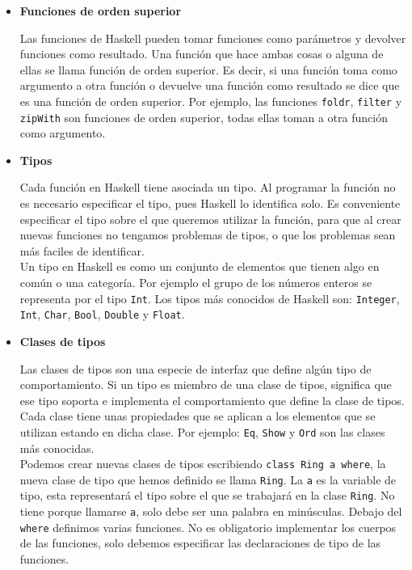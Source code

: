 \begin{itemize}

\item \textbf{Funciones de orden superior}

Las funciones de Haskell pueden tomar funciones como parámetros y devolver funciones como resultado. Una función que hace ambas cosas o alguna de ellas se llama función de orden superior. Es decir, si una función toma como argumento a otra función o devuelve una función como resultado se dice que es una función de orden superior. Por ejemplo, las funciones \texttt{foldr}, \texttt{filter} y \texttt{zipWith} son funciones de orden superior, todas ellas toman a otra función como argumento.\\

\item \textbf{Tipos}

Cada función en Haskell tiene asociada un tipo. Al programar la función no es necesario especificar el tipo, pues Haskell lo identifica solo. Es conveniente especificar el tipo sobre el que queremos utilizar la función, para que al crear nuevas funciones no tengamos problemas de tipos, o que los problemas sean más faciles de identificar.\\

Un tipo en Haskell es como un conjunto de elementos que tienen algo en común o una categoría. Por ejemplo el grupo de los números enteros  se representa por el tipo \texttt{Int}. Los tipos más conocidos de Haskell son: \texttt{Integer}, \texttt{Int}, \texttt{Char}, \texttt{Bool}, \texttt{Double} y \texttt{Float}.\\

\item  \textbf{Clases de tipos}

Las clases de tipos son una especie de interfaz que define algún tipo de comportamiento. Si un tipo es miembro de una clase de tipos, significa que ese tipo soporta e implementa el comportamiento que define la clase de tipos. Cada clase tiene unas propiedades que se aplican a los elementos que se utilizan estando en dicha clase. Por ejemplo: \texttt{Eq}, \texttt{Show} y \texttt{Ord} son las clases más conocidas.\\

Podemos crear nuevas clases de tipos escribiendo \texttt{class Ring a where}, la nueva clase de tipo que hemos definido se llama \texttt{Ring}. La \texttt{a} es la variable de tipo, esta representará el tipo sobre el que se trabajará en la clase \texttt{Ring}. No tiene porque llamarse \texttt{a}, solo debe ser una palabra en minúsculas. Debajo del \texttt{where} definimos varias funciones. No es obligatorio implementar los cuerpos de las funciones, solo debemos especificar las declaraciones de tipo de las funciones.\\


\end{itemize}
